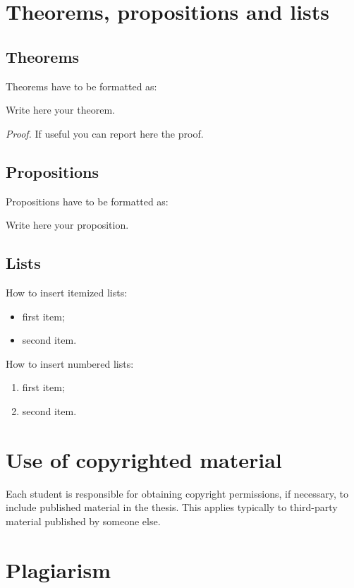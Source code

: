 \documentclass{Configuration_Files/PoliMi3i_thesis}
\begin{document}
\vspace{5mm}

\section{Theorems, propositions and lists}

\subsection{Theorems}
Theorems have to be formatted as:
\begin{theorem}
\label{a_theorem}
Write here your theorem.
\end{theorem}
\textit{Proof.} If useful you can report here the proof.

\subsection{Propositions}
Propositions have to be formatted as:
\begin{proposition}
Write here your proposition.
\end{proposition}

\subsection{Lists}
How to  insert itemized lists:
\begin{itemize}
    \item first item;
    \item second item.
\end{itemize}
How to insert numbered lists:
\begin{enumerate}
    \item first item;
    \item second item.
\end{enumerate}

\section{Use of copyrighted material}

Each student is responsible for obtaining copyright permissions, if necessary, to include published material in the thesis.
This applies typically to third-party material published by someone else.

\section{Plagiarism}
\end{document}

